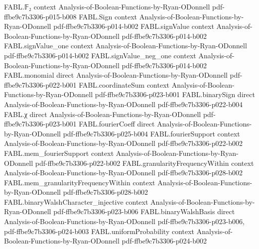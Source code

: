 \begin{theorem}
\label{FABL.binary_plancherel}
\leanok
{}
\proofstep
  {FABL.𝔽₂}
  {context}
  {Analysis-of-Boolean-Functions-by-Ryan-ODonnell}
  {pdf-ffbe9c7b3306-p015-b008}
\proofstep
  {FABL.Sign}
  {context}
  {Analysis-of-Boolean-Functions-by-Ryan-ODonnell}
  {pdf-ffbe9c7b3306-p014-b002}
\proofstep
  {FABL.signValue}
  {context}
  {Analysis-of-Boolean-Functions-by-Ryan-ODonnell}
  {pdf-ffbe9c7b3306-p014-b002}
\proofstep
  {FABL.signValue_one}
  {context}
  {Analysis-of-Boolean-Functions-by-Ryan-ODonnell}
  {pdf-ffbe9c7b3306-p014-b002}
\proofstep
  {FABL.signValue_neg_one}
  {context}
  {Analysis-of-Boolean-Functions-by-Ryan-ODonnell}
  {pdf-ffbe9c7b3306-p014-b002}
\proofstep
  {FABL.monomial}
  {direct}
  {Analysis-of-Boolean-Functions-by-Ryan-ODonnell}
  {pdf-ffbe9c7b3306-p022-b001}
\proofstep
  {FABL.coordinateSum}
  {context}
  {Analysis-of-Boolean-Functions-by-Ryan-ODonnell}
  {pdf-ffbe9c7b3306-p023-b001}
\proofstep
  {FABL.binarySign}
  {direct}
  {Analysis-of-Boolean-Functions-by-Ryan-ODonnell}
  {pdf-ffbe9c7b3306-p022-b004}
\proofstep
  {FABL.χ}
  {direct}
  {Analysis-of-Boolean-Functions-by-Ryan-ODonnell}
  {pdf-ffbe9c7b3306-p023-b001}
\proofstep
  {FABL.fourierCoeff}
  {direct}
  {Analysis-of-Boolean-Functions-by-Ryan-ODonnell}
  {pdf-ffbe9c7b3306-p025-b004}
\proofstep
  {FABL.fourierSupport}
  {context}
  {Analysis-of-Boolean-Functions-by-Ryan-ODonnell}
  {pdf-ffbe9c7b3306-p022-b002}
\proofstep
  {FABL.mem_fourierSupport}
  {context}
  {Analysis-of-Boolean-Functions-by-Ryan-ODonnell}
  {pdf-ffbe9c7b3306-p022-b002}
\proofstep
  {FABL.granularityFrequencyWithin}
  {context}
  {Analysis-of-Boolean-Functions-by-Ryan-ODonnell}
  {pdf-ffbe9c7b3306-p028-b002}
\proofstep
  {FABL.mem_granularityFrequencyWithin}
  {context}
  {Analysis-of-Boolean-Functions-by-Ryan-ODonnell}
  {pdf-ffbe9c7b3306-p028-b002}
\proofstep
  {FABL.binaryWalshCharacter_injective}
  {context}
  {Analysis-of-Boolean-Functions-by-Ryan-ODonnell}
  {pdf-ffbe9c7b3306-p023-b006}
\proofstep
  {FABL.binaryWalshBasis}
  {direct}
  {Analysis-of-Boolean-Functions-by-Ryan-ODonnell}
  {pdf-ffbe9c7b3306-p023-b006,
    pdf-ffbe9c7b3306-p024-b003}
\proofstep
  {FABL.uniformProbability}
  {context}
  {Analysis-of-Boolean-Functions-by-Ryan-ODonnell}
  {pdf-ffbe9c7b3306-p024-b002}

\end{theorem}
